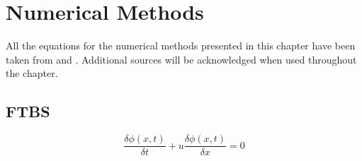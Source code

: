 
\section{Numerical Methods}
All the equations for the numerical methods presented in this chapter have been taken from \cite{mpebook} and \cite{nmnotes}. Additional sources will be acknowledged when used throughout the chapter.

\subsection{FTBS}

\begin{equation}
\frac{\delta \phi(x,t)}{\delta t}+u\frac{\delta \phi(x,t)}{\delta x}=0
\label{eq:linadvec}
\end{equation}
